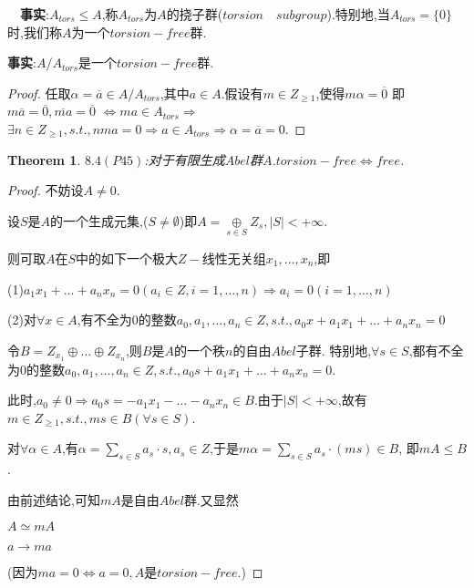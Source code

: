 \documentclass[UTF8]{article}
\newtheorem{thm}{Theorem}[section]
\begin{document}
$\quad$\textbf{事实}:$A_{tors}\leq A$,称$A_{tors}$为$A$的挠子群($torsion\quad subgroup$).特别地,当$A_{tors}=\{0\}$时,我们称$A$为一个$torsion-free$群.

\textbf{事实}:$A/A_{tors}$是一个$torsion-free$群.
\begin{proof}
	任取$\alpha=\overline a\in A/A_{tors}$,其中$a\in A$.假设有$m\in Z_{\geq 1}$,使得$m\alpha=\overline 0$
	即$m\overline a=\overline 0,\overline {ma}=\overline 0$
	$\iff ma\in A_{tors}\Rightarrow$ $\exists n\in Z_{\geq 1},s.t.,nma=0\Rightarrow a\in A_{tors}\Rightarrow \alpha=\overline a=0$.
	
\end{proof}

\begin{thm}
	\textbf{$8.4(P45)$}:对于有限生成$Abel$群$A$.$torsion-free\iff free$.
\end{thm}
\begin{proof}
	不妨设$A\neq 0$.
	
	设$S$是$A$的一个生成元集,($S\neq\emptyset$)即$A=\mathop{\oplus}\limits_{s\in S} Z_s,|S|<+\infty$.
	
	则可取$A$在$S$中的如下一个极大$Z-$线性无关组$x_1,\dots,x_n$,即
	
	(1)$a_1x_1+\dots+a_nx_n=0(a_i\in Z,i=1,\dots,n)\Rightarrow a_i=0(i=1,\dots,n)$
	
	(2)对$\forall x\in A$,有不全为$0$的整数$a_0,a_1,\dots,a_n\in Z,s.t.,a_0x+a_1x_1+\dots+a_nx_n=0$
	
	令$B=Z_{x_1}\oplus\dots\oplus Z_{x_n}$,则$B$是$A$的一个秩$n$的自由$Abel$子群.
	特别地,$\forall s\in S$,都有不全为$0$的整数$a_0,a_1,\dots,a_n\in Z,s.t.,a_0s+a_1x_1+\dots+a_nx_n=0$.
	
	此时,$a_0\neq 0\Rightarrow a_0s=-a_1x_1-\dots-a_nx_n\in B$.由于$|S|<+\infty$,故有$m\in Z_{\geq 1},s.t.,ms\in B(\forall s\in S)$.
	
	对$\forall\alpha\in A$,有$\alpha=\sum\limits_{s\in S} a_s\cdot s,a_s\in Z$,于是$m\alpha=\sum\limits_{s\in S} a_s\cdot (ms)\in B$,
	即$mA\leq B$.
	
	由前述结论,可知$mA$是自由$Abel$群.又显然
	\begin{center}
		$A\simeq mA$
		
		$a\rightarrow ma$
	\end{center}
	
	(因为$ma=0\iff a=0,A$是$torsion-free$.)
	
\end{proof}
\end{document}
